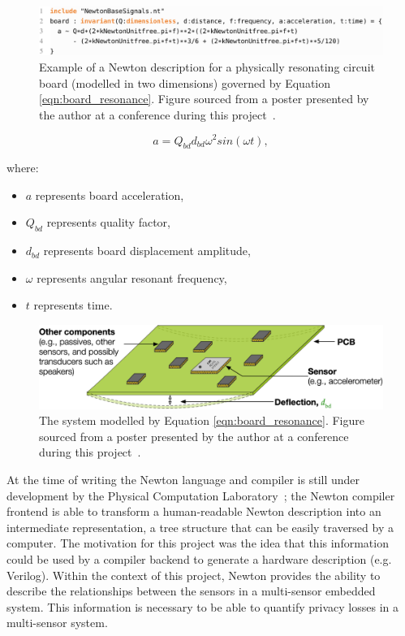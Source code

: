 \documentclass[12pt]{article}
\begin{document}
    \begin{figure}[H]
      \centering
      \includegraphics[width=\textwidth]{fig/newton_description.png}
      \caption{Example of a Newton description for a physically resonating circuit board (modelled in two dimensions) governed by Equation \ref{eqn:board_resonance}. Figure sourced from a poster presented by the author at a conference during this project~\cite{eurosys_poster}.}
      \label{fig:newton_description}
    \end{figure}

    \begin{equation}
      a = Q_{bd} d_{bd} \omega^2sin(\omega t),
      \label{eqn:board_resonance}
    \end{equation}

    where:
    \begin{itemize}
      \item $a$ represents board acceleration,
      \item $Q_{bd}$ represents quality factor,
      \item $d_{bd}$ represents board displacement amplitude,
      \item $\omega$ represents angular resonant frequency,
      \item $t$ represents time.
    \end{itemize}

    \begin{figure}[H]
      \centering
      \includegraphics[width=\textwidth]{fig/resonating_board.png}
      \caption{The system modelled by Equation \ref{eqn:board_resonance}. Figure sourced from a poster presented by the author at a conference during this project~\cite{eurosys_poster}.}
      \label{fig:resonating_board}
    \end{figure}

    At the time of writing the Newton language and compiler is still under development by the Physical Computation Laboratory~\cite{physcomp}; the Newton compiler frontend is able to transform a human-readable Newton description into an intermediate representation, a tree structure that can be easily traversed by a computer. The motivation for this project was the idea that this information could be used by a compiler backend to generate a hardware description (e.g. Verilog). Within the context of this project, Newton provides the ability to describe the relationships between the sensors in a multi-sensor embedded system. This information is necessary to be able to quantify privacy losses in a multi-sensor system.
\end{document}

